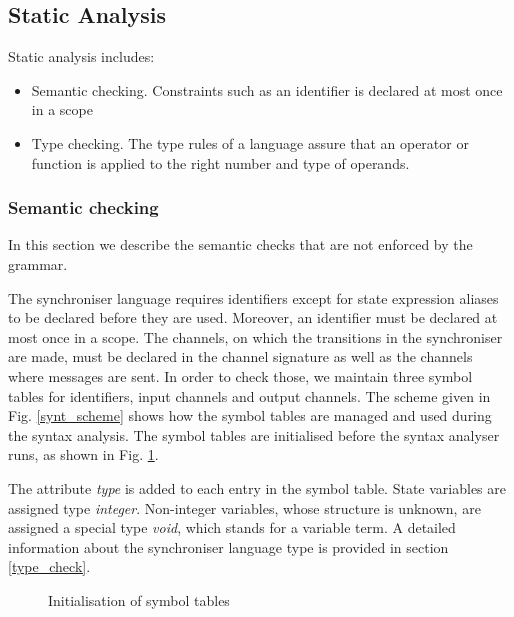 


\subsection{Static Analysis}
Static analysis includes:
\begin{itemize}
\item Semantic checking. Constraints such as an identifier is declared at most once in a scope
\item Type checking. The type rules of a language assure that an operator or function is applied to the right number and type of operands.
\end{itemize}

  \subsubsection*{Semantic checking}
In this section we describe the semantic checks that are not enforced by the grammar.

The synchroniser language requires identifiers except for state expression aliases to be declared before they are used. Moreover, an identifier must be declared at most once in a scope. The channels, on which the transitions in the synchroniser are made, must be declared in the channel signature as well as the channels where messages are sent. In order to check those, we maintain three symbol tables for identifiers, input channels and output channels. The scheme given in Fig. \ref{synt_scheme} shows how the symbol tables are managed and used during the syntax analysis. The symbol tables are initialised before the syntax analyser runs, as shown in Fig. \ref{symtab_init}.

The attribute \emph{type} is added to each entry in the symbol table. State variables are assigned type \emph{integer}. Non-integer variables, whose structure is unknown, are assigned a special type \emph{void}, which stands for a variable  term. A detailed information about the synchroniser language type  is provided in section \ref{type_check}.

\begin{figure}[h!]
\noindent{}
\caption{Initialisation of symbol tables\label{symtab_init}}
\end{figure}



